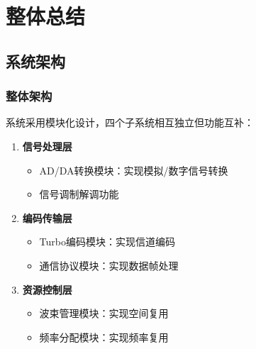 \documentclass[12pt]{article}
\begin{document}
\section{整体总结}


\subsection{系统架构}
\subsubsection{整体架构}
系统采用模块化设计，四个子系统相互独立但功能互补：
\begin{enumerate}
    \item \textbf{信号处理层}
    \begin{itemize}
        \item AD/DA转换模块：实现模拟/数字信号转换
        \item 信号调制解调功能
    \end{itemize}
    
    \item \textbf{编码传输层}
    \begin{itemize}
        \item Turbo编码模块：实现信道编码
        \item 通信协议模块：实现数据帧处理
    \end{itemize}
    
    \item \textbf{资源控制层}
    \begin{itemize}
        \item 波束管理模块：实现空间复用
        \item 频率分配模块：实现频率复用
    \end{itemize}
\end{enumerate}
\end{document}

